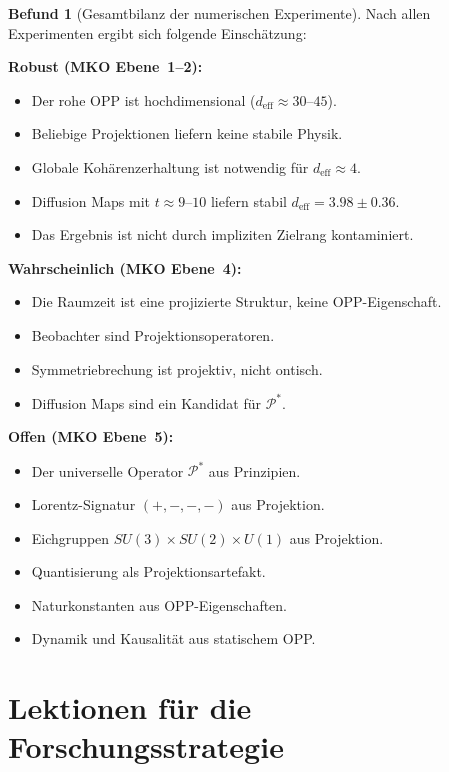 \documentclass[11pt,a4paper]{article}
\theoremstyle{plain}
\theoremstyle{definition}
\newtheorem{befund}{Befund}[section]
\newcommand{\deff}{d_{\mathrm{eff}}}
\newcommand{\Proj}{\mathcal{P}}
\begin{document}
\begin{befund}[Gesamtbilanz der numerischen Experimente]
Nach allen Experimenten ergibt sich folgende Einsch\"{a}tzung:

\medskip
\textbf{Robust (MKO Ebene~1--2):}
\begin{itemize}
  \item Der rohe OPP ist hochdimensional ($\deff \approx 30$--$45$).
  \item Beliebige Projektionen liefern keine stabile Physik.
  \item Globale Koh\"{a}renzerhaltung ist notwendig f\"{u}r $\deff \approx 4$.
  \item Diffusion Maps mit $t \approx 9$--$10$ liefern stabil
        $\deff = 3.98 \pm 0.36$.
  \item Das Ergebnis ist nicht durch impliziten Zielrang kontaminiert.
\end{itemize}

\medskip
\textbf{Wahrscheinlich (MKO Ebene~4):}
\begin{itemize}
  \item Die Raumzeit ist eine projizierte Struktur, keine OPP-Eigenschaft.
  \item Beobachter sind Projektionsoperatoren.
  \item Symmetriebrechung ist projektiv, nicht ontisch.
  \item Diffusion Maps sind ein Kandidat f\"{u}r $\Proj^\ast$.
\end{itemize}

\medskip
\textbf{Offen (MKO Ebene~5):}
\begin{itemize}
  \item Der universelle Operator $\Proj^\ast$ aus Prinzipien.
  \item Lorentz-Signatur $(+,-,-,-)$ aus Projektion.
  \item Eichgruppen $SU(3) \times SU(2) \times U(1)$ aus Projektion.
  \item Quantisierung als Projektionsartefakt.
  \item Naturkonstanten aus OPP-Eigenschaften.
  \item Dynamik und Kausalit\"{a}t aus statischem OPP.
\end{itemize}
\end{befund}

\section{Lektionen f\"{u}r die Forschungsstrategie}
\end{document}
